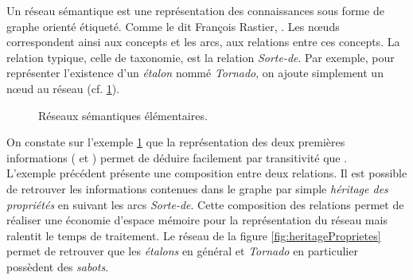 

Un réseau sémantique est une représentation des connaissances sous
forme de graphe orienté étiqueté. Comme le dit François Rastier,
  \cite{Rastier2004}. Les n\oe uds correspondent ainsi
aux concepts et les arcs, aux relations entre ces concepts. La
relation typique, celle de taxonomie, est la relation \emph{Sorte-de}.
Par exemple, pour représenter l'existence d'un \emph{étalon} nommé
\emph{Tornado}, on ajoute simplement un n\oe ud au réseau (cf.
\ref{fig:ReseauxElem}).

\begin{figure}[htbp]
  \centering {} \centering {}

  \caption{Réseaux sémantiques élémentaires.}\label{fig:ReseauxElem}
\end{figure}

On constate sur l'exemple \ref{fig:ReseauxElem} que la représentation
des deux premières informations ( et
) permet de déduire facilement par
transitivité que .\\


L'exemple précédent présente une composition entre deux relations.  Il
est possible de retrouver les informations contenues dans le graphe
par simple \emph{héritage des propriétés} en suivant les arcs
\emph{Sorte-de}.  Cette composition des relations %
permet de réaliser une
économie d'espace mémoire pour la représentation du réseau mais
ralentit le temps de traitement. %
Le réseau de la figure
\ref{fig:heritageProprietes} permet de retrouver que les
\emph{étalons} en général et \emph{Tornado} en particulier possèdent
des \emph{sabots}. 



